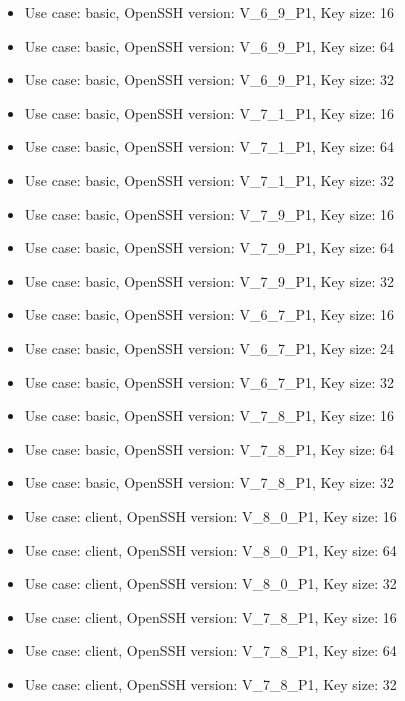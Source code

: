 \begin{itemize}
            \item Use case: basic, OpenSSH version: V\_6\_9\_P1, Key size: 16
            \item Use case: basic, OpenSSH version: V\_6\_9\_P1, Key size: 64
            \item Use case: basic, OpenSSH version: V\_6\_9\_P1, Key size: 32
            \item Use case: basic, OpenSSH version: V\_7\_1\_P1, Key size: 16
            \item Use case: basic, OpenSSH version: V\_7\_1\_P1, Key size: 64
            \item Use case: basic, OpenSSH version: V\_7\_1\_P1, Key size: 32
            \item Use case: basic, OpenSSH version: V\_7\_9\_P1, Key size: 16
            \item Use case: basic, OpenSSH version: V\_7\_9\_P1, Key size: 64
            \item Use case: basic, OpenSSH version: V\_7\_9\_P1, Key size: 32
            \item Use case: basic, OpenSSH version: V\_6\_7\_P1, Key size: 16
            \item Use case: basic, OpenSSH version: V\_6\_7\_P1, Key size: 24
            \item Use case: basic, OpenSSH version: V\_6\_7\_P1, Key size: 32
            \item Use case: basic, OpenSSH version: V\_7\_8\_P1, Key size: 16
            \item Use case: basic, OpenSSH version: V\_7\_8\_P1, Key size: 64
            \item Use case: basic, OpenSSH version: V\_7\_8\_P1, Key size: 32
            \item Use case: client, OpenSSH version: V\_8\_0\_P1, Key size: 16
            \item Use case: client, OpenSSH version: V\_8\_0\_P1, Key size: 64
            \item Use case: client, OpenSSH version: V\_8\_0\_P1, Key size: 32
            \item Use case: client, OpenSSH version: V\_7\_8\_P1, Key size: 16
            \item Use case: client, OpenSSH version: V\_7\_8\_P1, Key size: 64
            \item Use case: client, OpenSSH version: V\_7\_8\_P1, Key size: 32
        \end{itemize}

